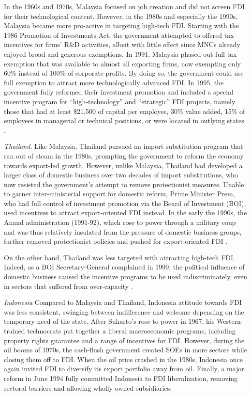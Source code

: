 In the 1960s and 1970s, Malaysia focused on job creation and did not screen FDI
for their technological content. However, in the 1980s and especially the 1990s,
Malaysia became more pro-active in targeting high-tech FDI. Starting with the
1986 Promotion of Investments Act, the government attempted to offered tax
incentives for firms' R\&D activities, albeit with little effect since MNCs
already enjoyed broad and generous exemptions. In 1991, Malaysia phased out full
tax exemption that was available to almost all exporting firms, now exempting
only 60\% instead of 100\% of corporate profits. By doing so, the government
could use full exemption to attract more technologically advanced FDI. In 1995,
the government fully reformed their investment promotion and included a special
incentive program for ``high-technology'' and ``strategic'' FDI projects, namely
those that had at least \$21,500 of capital per employee, 30\% value added, 15\%
of employees in managerial or technical positions, or were located in outlying
states \citep{Felker2001}.

\textit{Thailand}. Like Malaysia, Thailand pursued an import substitution
program that ran out of steam in the 1980s, prompting the government to reform
the economy towards export-led growth. However, unlike Malaysia, Thailand had
developed a larger class of domestic business over two decades of import
substitutions, who now resisted the government's attempt to remove protectionist
measures. Unable to garner inter-ministerial support for domestic reform, Prime
Minister Prem, who had full control of investment promotion via the Board of
Investment (BOI), used incentives to attract export-oriented FDI instead. In the early
the 1990s, the Anand administration (1991-92), which rose to power through a
military coup and was thus relatively insulated from the pressure of domestic
business groups, further removed protectionist policies and pushed for
export-oriented FDI \citep{Felker2001}.

On the other hand, Thailand was less targeted with attracting high-tech FDI.
Indeed, as a BOI Secretary-General complained in 1999, the political influence
of domestic business caused the incentive programs to be used indiscriminately,
even in sectors that suffered from over-capacity \citep[90]{Felker2003}.

\textit{Indonesia} Compared to Malaysia and Thailand, Indonesia attitude towards
FDI was less consistent, swinging between indifference and welcome depending on
the temporary need of the state. After Suharto's rose to power in 1967, his
Western-trained technocrats put together a liberal macroeconomic programs,
including property rights guarantee and a range of incentives for FDI. However,
during the oil booms of 1970s, the cash-flush government created SOEs in more
sectors while closing them off to FDI. When the oil price crashed in the 1980s,
Indonesia once again invited FDI to diversify its export portfolio away from
oil. Finally, a major reform in June 1994 fully committed Indonesia to FDI
liberalization, removing sectoral barriers and allowing wholly owned
subsidiaries.

